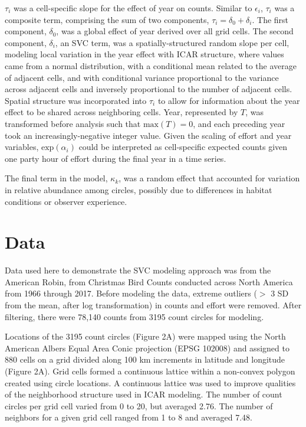 \documentclass[]{article}
\begin{document}
$\tau_i$ was a cell-specific slope for the effect of year on counts. Similar to $\epsilon_i$, $\tau_i$ was a composite term, comprising the sum of two components, $\tau_i = \delta_0 + \delta_i$. The first component, $\delta_0$, was a global effect of year derived over all grid cells. The second component, $\delta_i$, an SVC term, was a spatially-structured random slope per cell, modeling local variation in the year effect with ICAR structure, where values came from a normal distribution, with a conditional mean related to the average of adjacent cells, and with conditional variance proportional to the variance across adjacent cells and inversely proportional to the number of adjacent cells. Spatial structure was incorporated into $\tau_i$ to allow for information about the year effect to be shared across neighboring cells. Year, represented by $T$, was transformed before analysis such that $\text{max}(T) = 0$, and each preceding year took an increasingly-negative integer value. Given the scaling of effort and year variables, $\text{exp}(\alpha_i)$ could be interpreted as cell-specific expected counts given one party hour of effort during the final year in a time series.

The final term in the model, $\kappa_{k}$, was a random effect that accounted for variation in relative abundance among circles, possibly due to differences in habitat conditions or observer experience.


\section{Data}
Data used here to demonstrate the SVC modeling approach was from the American Robin, from Christmas Bird Counts conducted across North America from 1966 through 2017. Before modeling the data, extreme outliers ($>$ 3 SD from the mean, after log transformation) in counts and effort were removed. After filtering, there were 78,140 counts from 3195 count circles for modeling.

Locations of the 3195 count circles (Figure 2A) were mapped using the North American Albers Equal Area Conic projection (EPSG 102008) and assigned to 880 cells on a grid divided along 100 km increments in latitude and longitude (Figure 2A). Grid cells formed a continuous lattice within a non-convex polygon created using circle locations. A continuous lattice was used to improve qualities of the neighborhood structure used in ICAR modeling. The number of count circles per grid cell varied from 0 to 20, but averaged 2.76. The number of neighbors for a given grid cell ranged from 1 to 8 and averaged 7.48.
\end{document}
